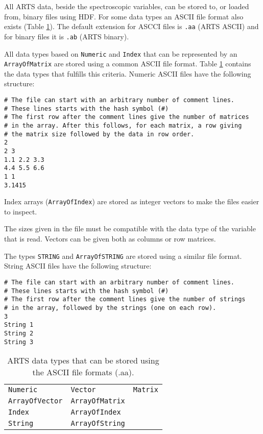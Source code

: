  \label{sec:formats:files}
 
 All ARTS data, beside the spectroscopic variables, can be stored to,
 or loaded from, binary files using HDF.  For some data types an ASCII
 file format also exists (Table \ref{table:format:aa}). The default
 extension for ASCCI files is \verb|.aa| (ARTS ASCII) and for binary
 files it is \verb|.ab| (ARTS binary).
 
  \label{sec:formats:file:ascii}
  
  All data types based on \verb|Numeric| and \verb|Index| that can be
  represented by an \verb|ArrayOfMatrix| are stored using a common ASCII
  file format. Table \ref{table:format:aa} contains the data types that
  fulfills this criteria. Numeric ASCII files have the following 
  structure: \\
  {\footnotesize \begin{verbatim} 
# The file can start with an arbitrary number of comment lines.  
# These lines starts with the hash symbol (#) 
# The first row after the comment lines give the number of matrices 
# in the array. After this follows, for each matrix, a row giving 
# the matrix size followed by the data in row order.  
2 
2 3 
1.1 2.2 3.3 
4.4 5.5 6.6 
1 1 
3.1415
 \end{verbatim} 
}

 \noindent
 Index arrays (\verb|ArrayOfIndex|) are stored as integer vectors to
 make the files easier to inspect.
     
 The sizes given in the file must be compatible with the data type
 of the variable that is read. Vectors can be given both as
 columns or row matrices.
 
 The types \verb|STRING| and \verb|ArrayOfSTRING| are stored using a
 similar file format. String ASCII files have the following structure:
 {\footnotesize \begin{verbatim} 
# The file can start with an arbitrary number of comment lines.
# These lines starts with the hash symbol (#)
# The first row after the comment lines give the number of strings
# in the array, followed by the strings (one on each row).  
3
String 1
String 2
String 3
 \end{verbatim} 
}

 \begin{table}[t]
  \begin{tabular}{p{4cm} p{4cm} p{4cm}}
   \verb|Numeric|        & \verb|Vector|         & \verb|Matrix|          \\
   \verb|ArrayOfVector|  & \verb|ArrayOfMatrix|  &                        \\
   \verb|Index|          & \verb|ArrayOfIndex|  &                        \\
   \verb|String|          & \verb|ArrayOfString|  &                        \\
  \end{tabular}
  \caption{ARTS data types that can be stored using the ASCII
           file formats (.aa).}
  \label{table:format:aa}
 \end{table}
 

